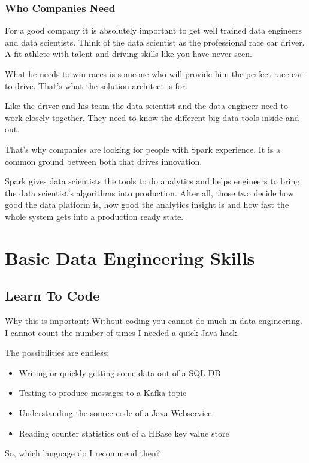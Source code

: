 \documentclass[12pt, numbers=noenddot]{scrreprt} %
\begin{document}
\section{Who Companies Need}
For a good company it is absolutely important to get well trained data engineers and data scientists. Think of the data scientist as the professional race car driver. A fit athlete with talent and driving skills like you have never seen.

What he needs to win races is someone who will provide him the perfect race car to drive. That’s what the solution architect is for.

Like the driver and his team the data scientist and the data engineer need to work closely together. They need to know the different big data tools inside and out.

That's why companies are looking for people with Spark experience. It is a common ground between both that drives innovation.

Spark gives data scientists the tools to do analytics and helps engineers to bring the data scientist’s algorithms into production. After all, those two decide how good the data platform is, how good the analytics insight is and how fast the whole system gets into a production ready state.

\part{Basic Data Engineering Skills}

\chapter{Learn To Code}

Why this is important: Without coding you cannot do much in data engineering. I cannot count the number of times I needed a quick Java hack.

The possibilities are endless:

\begin{itemize}
\item Writing or quickly getting some data out of a SQL DB
\item Testing to produce messages to a Kafka topic
\item Understanding the source code of a Java Webservice
\item Reading counter statistics out of a HBase key value store
\end{itemize}
So, which language do I recommend then?
\end{document}
